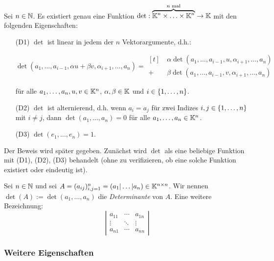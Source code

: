 \begin{thm}
	Sei $ n \in \mathbb N $. Es existiert genau eine Funktion $ \det : \overbrace{\mathbb K^n \times \ldots \times \mathbb K^n}^\text{$ n $ mal} \to \mathbb K $ mit den folgenden Eigenschaften:
	\begin{itemize}
		\item[\normalfont(D1)]
			$ \det $ ist linear in jedem der $ n $ Vektorargumente, d.h.:
			
			$ \det(a_1, \ldots, a_{i-1}, \alpha u + \beta v, \alpha_{i+1}, \ldots, a_n) =
			\begin{aligned}[t]
				&\: \alpha\det(a_1, \ldots, a_{i-1}, u, \alpha_{i+1}, \ldots, a_n) \\
				+ &\: \beta\det(a_1, \ldots, a_{i-1}, v, \alpha_{i+1}, \ldots, a_n)
			\end{aligned} $
			
			für alle $ a_1, \ldots, a_n, u, v \in \mathbb K^n $, $ \alpha, \beta \in \mathbb K $ und $ i \in \{ 1,\ldots,n \} $.
		\item[\normalfont(D2)]
			$ \det $ ist alternierend, d.h. wenn $ a_i = a_j $ für zwei Indizes $ i,j \in \{ 1,\ldots,n \} $ mit $ i \neq j $, dann $ \det(a_1, \ldots, a_n) = 0 $ für alle $ a_1, \ldots, a_n \in \mathbb K^n $.
		\item[\normalfont(D3)]
			$ \det(e_1, \ldots, e_n) = 1 $.
	\end{itemize}
\end{thm}

\noindent Der Beweis wird später gegeben. Zunächst wird $ \det $ als eine beliebige Funktion mit (D1), (D2), (D3) behandelt (ohne zu verifizieren, ob eine solche Funktion existiert oder eindeutig ist).

Sei $ n \in \mathbb N $ und sei $ A = (a_{ij})_{i,j=1}^n = (a_1|\ldots|a_n) \in \mathbb K^{n \times n} $. Wir nennen $ \det(A) := \det(a_1, \ldots, a_n) $ die \emph{Determinante} von $ A $. Eine weitere Bezeichnung:
\begin{equation}
	\left| \begin{matrix}
		a_{11} & \cdots & a_{1n} \\
		\vdots & \ddots & \vdots \\
		a_{n1} & \cdots & a_{nn}
	\end{matrix} \right|
\end{equation}

\subsubsection{Weitere Eigenschaften}


